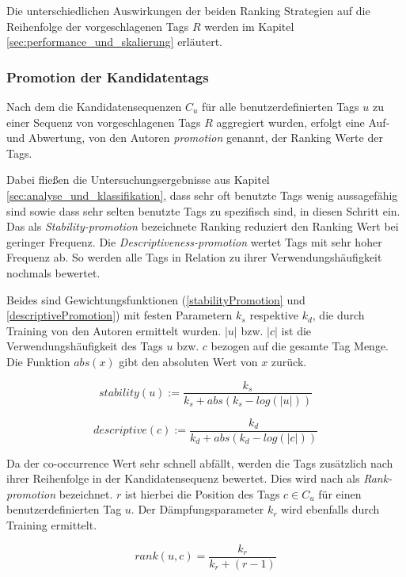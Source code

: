 Die unterschiedlichen Auswirkungen der beiden Ranking Strategien auf die Reihenfolge der vorgeschlagenen Tags $R$ werden im Kapitel \ref{sec:performance_und_skalierung} erläutert. 

\subsubsection{Promotion der Kandidatentags} %
\label{ssub:promotion}
Nach dem die Kandidatensequenzen $C_u$ für alle benutzerdefinierten Tags $u$ zu einer Sequenz von vorgeschlagenen Tags $R$ aggregiert wurden, erfolgt eine Auf- und Abwertung, von den Autoren \emph{promotion} genannt, der Ranking Werte der Tags.

Dabei fließen die Untersuchungsergebnisse aus Kapitel \ref{sec:analyse_und_klassifikation}, dass sehr oft benutzte Tags wenig aussagefähig sind sowie dass sehr selten benutzte Tags zu spezifisch sind, in diesen Schritt ein. Das als \emph{Stability-promotion} bezeichnete Ranking reduziert den Ranking Wert bei geringer Frequenz. Die \emph{Descriptiveness-promotion} wertet Tags mit sehr hoher Frequenz ab. So werden alle Tags in Relation zu ihrer Verwendungshäufigkeit nochmals bewertet. 

Beides sind Gewichtungsfunktionen (\ref{stabilityPromotion} und \ref{descriptivePromotion}) mit festen Parametern $k_s$ respektive $k_d$, die durch Training von den Autoren ermittelt wurden. $\vert u \vert$ bzw. $\vert c \vert$ ist die Verwendungshäufigkeit des Tags $u$ bzw. $c$ bezogen auf die gesamte Tag Menge. Die Funktion $abs(x)$ gibt den absoluten Wert von $x$ zurück.
\begin{figure}[hptb]
 \begin{equation}
 \label{stabilityPromotion}
    stability(u) := \frac{k_s}{k_s + abs(k_s - log(\vert u \vert))}
 \end{equation}
\end{figure}

\begin{figure}[hptb]
 \begin{equation}
 \label{descriptivePromotion}
    descriptive(c) := \frac{k_d}{k_d + abs(k_d - log(\vert c \vert))}
 \end{equation}
\end{figure}



Da der co-occurrence Wert sehr schnell abfällt, werden die Tags zusätzlich nach ihrer Reihenfolge in der Kandidatensequenz bewertet. Dies wird nach \cite{collectiveKnowledge} als \emph{Rank-promotion} bezeichnet. $r$ ist hierbei die Position des Tags $c \in C_u$ für einen benutzerdefinierten Tag $u$. Der Dämpfungsparameter $k_r$ wird ebenfalls durch Training ermittelt. 
\begin{figure}[hptb]
 \begin{equation}
 \label{rankPromotion}
    rank(u, c) = \frac{k_r}{k_r + (r-1)}
 \end{equation}
\end{figure}


